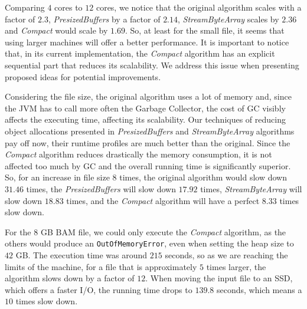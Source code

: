 \documentclass[a4paper,twoside]{article}
\begin{document}
Comparing $4$ cores to $12$ cores, we notice that the original algorithm scales with a factor of $2.3$, {\it PresizedBuffers} by a factor of $2.14$, {\it StreamByteArray} scales by $2.36$ and {\it Compact} would scale by $1.69$. So, at least for the small file, it seems that using larger machines will offer a better performance. It is important to notice that, in its current implementation, the {\it Compact} algorithm has an explicit sequential part that reduces its scalability. We address this issue when presenting proposed ideas for potential improvements.

Considering the file size, the original algorithm uses a lot of memory and, since the JVM has to call more often the Garbage Collector, the cost of GC visibly affects the executing time, affecting its scalability. Our techniques of reducing object allocations presented in {\it PresizedBuffers} and {\it StreamByteArray} algorithms pay off now, their runtime profiles are much better than the original. Since the {\it Compact} algorithm reduces drastically the memory consumption, it is not affected too much by GC and the overall running time is significantly superior. 
So, for an increase in file size $8$ times, the original algorithm would slow down $31.46$ times, the {\it PresizedBuffers} will slow down $17.92$ times, {\it StreamByteArray} will slow down $18.83$ times,
and the {\it Compact} algorithm will have a perfect $8.33$ times slow down.

For the $8$ GB BAM file, we could only execute the {\it Compact} algorithm, as the others would produce an \texttt{OutOfMemoryError}, even when setting the heap size to $42$ GB.
The execution time was around $215$ seconds, so as we are reaching the limits of the machine, for a file that is approximately $5$ times larger, the algorithm slows down by a factor of $12$. When moving the input file to an SSD, which offers a faster I/O, the running time drops to $139.8$ seconds, which means a $10$ times slow down.

\end{document}
